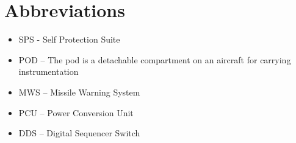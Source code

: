\documentclass[Main]{subfiles}
\begin{document}
\section{Abbreviations}

\begin{itemize}

\item SPS - Self Protection Suite

\item POD -- The pod is a detachable compartment on an aircraft for carrying instrumentation

\item MWS -- Missile Warning System

\item PCU -- Power Conversion Unit

\item DDS -- Digital Sequencer Switch

\end{itemize}
\end{document}

